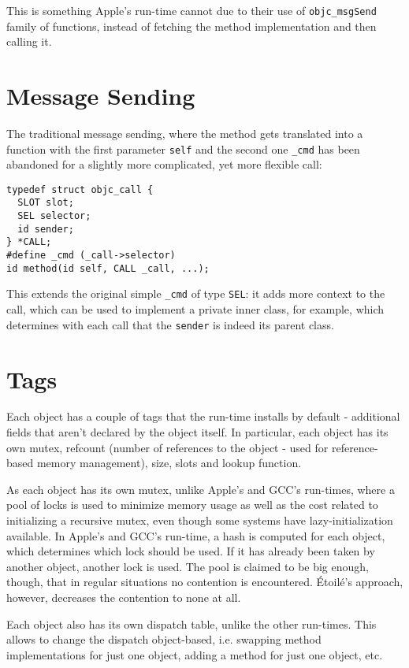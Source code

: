 This is something Apple's run-time cannot due to their use of \verb=objc_msgSend= family of functions, instead of fetching the method implementation and then calling it.

\section{Message Sending}

The traditional message sending, where the method gets translated into a function with the first parameter \verb=self= and the second one \verb=_cmd= has been abandoned for a slightly more complicated, yet more flexible call:

\begin{verbatim}
typedef struct objc_call {
  SLOT slot;
  SEL selector;
  id sender;
} *CALL;
#define _cmd (_call->selector)
id method(id self, CALL _call, ...);
\end{verbatim}

This extends the original simple \verb=_cmd= of type \verb=SEL=: it adds more context to the call, which can be used to implement a private inner class, for example, which determines with each call that the \verb=sender= is indeed its parent class.

\section{Tags}

Each object has a couple of tags that the run-time installs by default - additional fields that aren't declared by the object itself. In particular, each object has its own mutex, refcount (number of references to the object - used for reference-based memory management), size, slots and lookup function.

As each object has its own mutex, unlike Apple's and GCC's run-times, where a pool of locks is used to minimize memory usage as well as the cost related to initializing a recursive mutex, even though some systems have lazy-initialization available. In Apple's and GCC's run-time, a hash is computed for each object, which determines which lock should be used. If it has already been taken by another object, another lock is used. The pool is claimed to be big enough, though, that in regular situations no contention is encountered. \'Etoil\'e's approach, however, decreases the contention to none at all.

Each object also has its own dispatch table, unlike the other run-times. This allows to change the dispatch object-based, i.e. swapping method implementations for just one object, adding a method for just one object, etc.

